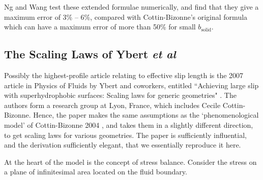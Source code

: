 \documentclass[a4paper]{report}
\begin{document}
Ng and Wang test these extended formulae numerically, and find that they give a maximum error of 3\% -- 6\%, compared with Cottin-Bizonne's original formula which can have a maximum error of more than 50\% for small $b_{\mathrm{solid}}$.


\subsection*{The Scaling Laws of Ybert \emph{et al}}

Possibly the highest-profile article relating to effective slip length is the 2007 article in Physics of Fluids by Ybert and coworkers, entitled ``Achieving large slip with superhydrophobic surfaces: Scaling laws for generic geometries" \cite{Ybert2007}. The authors form a research group at Lyon, France, which includes Cecile Cottin-Bizonne.  Hence, the paper makes the same assumptions as the `phenomenological model' of Cottin-Bizonne 2004 \cite{Cottin-Bizonne2004}, and takes them in a slightly different direction, to get scaling laws for various geometries.
The paper is sufficiently influential, and the derivation sufficiently elegant, that we essentially reproduce it here.


At the heart of the model is the concept of stress balance.  Consider the stress on a plane of infinitesimal area located on the fluid boundary.

\begin{center}
\end{center}
\end{document}
